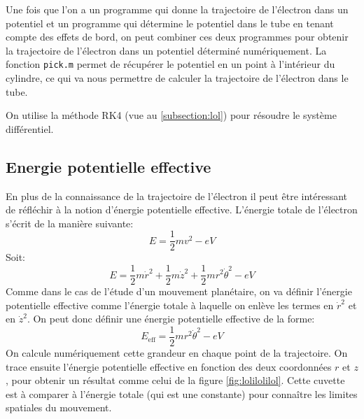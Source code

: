 \documentclass[a4paper,12pt]{article}
\begin{document}
Une fois que l'on a un programme qui donne la trajectoire de l'électron dans un potentiel et un programme qui détermine le potentiel dans le tube en tenant compte des effets de bord, on peut combiner ces deux programmes pour obtenir la trajectoire de l'électron dans un potentiel déterminé numériquement. La fonction \verb|pick.m| permet de récupérer le potentiel en un point à l'intérieur du cylindre, ce qui va nous permettre de calculer la trajectoire de l'électron dans le tube.

On utilise la méthode RK4 (vue au \ref{subsection:lol}) pour résoudre le système différentiel.

\subsection{Energie potentielle effective}

En plus de la connaissance de la trajectoire de l'électron il peut être intéressant de réfléchir à la notion d'énergie potentielle effective. L'énergie totale de l'électron s'écrit de la manière suivante:
\[
E = \frac 1 2 mv^2 - eV
\]
Soit:
\[
E = \frac 1 2 m \dot{r}^2 + \frac 1 2 m \dot{z}^2 + \frac 1 2 m r^2 \dot{\theta}^2 - e V
\]
Comme dans le cas de l'étude d'un mouvement planétaire, on va définir l'énergie potentielle effective comme l'énergie totale à laquelle on enlève les termes en $\dot{r}^2$ et en $\dot{z}^2$. On peut donc définir une énergie potentielle effective de la forme:
\[
E_{\mathrm{eff}} = \frac 1 2 m r^2 \dot{\theta}^2 -e V
\]
On calcule numériquement cette grandeur en chaque point de la trajectoire. On trace ensuite l'énergie potentielle effective en fonction des deux coordonnées $r$ et $z$, pour obtenir un résultat comme celui de la figure \ref{fig:lolilolilol}. Cette cuvette est à comparer à l'énergie totale (qui est une constante) pour connaître les limites spatiales du mouvement.
\end{document}
